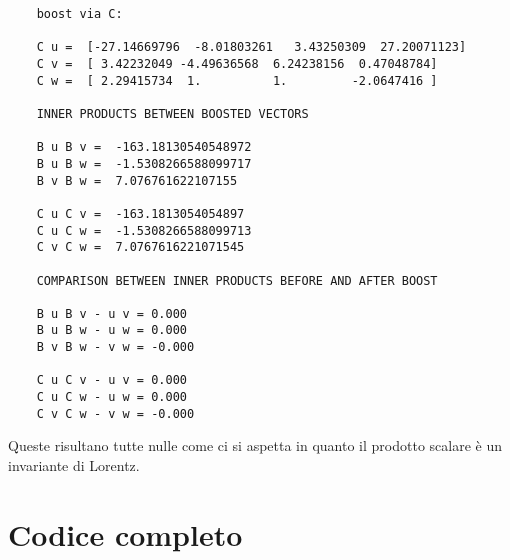 \documentclass[12pt,notitlepage]{report}
\begin{document}
\begin{verbatim}
	boost via C:
	
	C u =  [-27.14669796  -8.01803261   3.43250309  27.20071123]
	C v =  [ 3.42232049 -4.49636568  6.24238156  0.47048784]
	C w =  [ 2.29415734  1.          1.         -2.0647416 ]
	
	INNER PRODUCTS BETWEEN BOOSTED VECTORS
	
	B u B v =  -163.18130540548972
	B u B w =  -1.5308266588099717
	B v B w =  7.076761622107155
	
	C u C v =  -163.1813054054897
	C u C w =  -1.5308266588099713
	C v C w =  7.0767616221071545
	
	COMPARISON BETWEEN INNER PRODUCTS BEFORE AND AFTER BOOST
	
	B u B v - u v = 0.000
	B u B w - u w = 0.000
	B v B w - v w = -0.000
	
	C u C v - u v = 0.000
	C u C w - u w = 0.000
	C v C w - v w = -0.000
\end{verbatim}

Queste risultano tutte nulle come ci si aspetta in quanto il prodotto scalare è un invariante di Lorentz.


\section{Codice completo}
\end{document}
